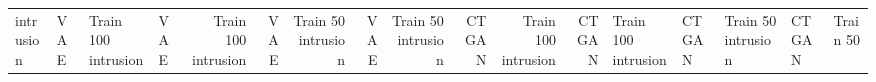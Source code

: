 \begin{table}[ht]
\begin{tabular}{llllrrrrrrrr}
intrusion & VAE & Train 100%
intrusion & VAE & Train 100%
intrusion & VAE & Train 50%
intrusion & VAE & Train 50%
intrusion & CTGAN & Train 100%
intrusion & CTGAN & Train 100%
intrusion & CTGAN & Train 50%
intrusion & CTGAN & Train 50%
\bottomrule
\end{tabular}
\end{table}